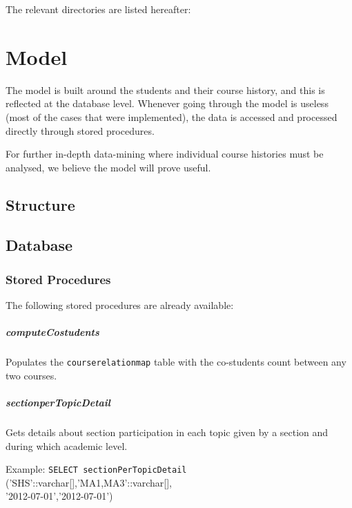 The relevant directories are listed hereafter:


\chapter{Model}
The model is built around the students and their course history, and this is reflected at the database level. Whenever going through the model is useless (most of the cases that were implemented), the data is accessed and processed directly through stored procedures.

For further in-depth data-mining where individual course histories must be analysed, we believe the model will prove useful.
\section{Structure}

\section{Database}

\subsection{Stored Procedures}
The following stored procedures are already available:
\paragraph{computeCostudents}
Populates the \verb|courserelationmap| table with the co-students count between any two courses.

\paragraph{sectionperTopicDetail} Gets details about section participation in each topic given by a section and during which academic level.

Example: \verb|SELECT sectionPerTopicDetail| ('{SHS}'::varchar[],'{MA1,MA3}'::varchar[],\\'2012-07-01','2012-07-01')

